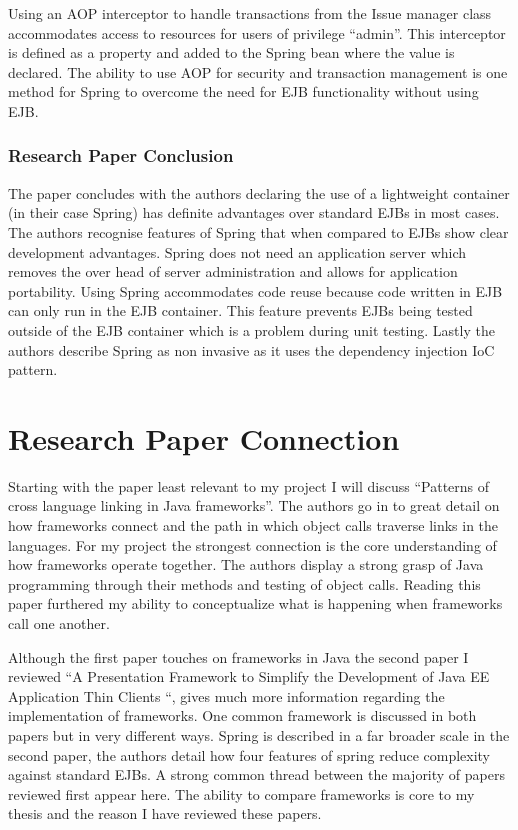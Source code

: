 														Using an AOP interceptor to handle transactions from the Issue manager class accommodates access to resources for users of privilege “admin”. This interceptor is defined as a property and added to the Spring bean where the value is declared. The ability to use AOP for security and transaction management is one method for Spring to overcome the need for EJB functionality without using EJB.
														
														\subsubsection{Research Paper Conclusion}
														The paper concludes with the authors declaring the use of a lightweight container (in their case Spring) has definite advantages over standard EJBs in most cases. The authors recognise features of Spring that when compared to EJBs show clear development advantages. Spring does not need an application server which removes the over head of server administration and allows for application portability. Using Spring accommodates code reuse because code written in EJB can only run in the EJB container. This feature prevents EJBs being tested outside of the EJB container which is a problem during unit testing. Lastly the authors describe Spring as non invasive as it uses the dependency injection IoC pattern. 
														
														\section{Research Paper Connection}
														
														Starting with the paper least relevant to my project I will discuss “Patterns of cross language linking in Java frameworks”. The authors go in to great detail on how frameworks connect and the path in which object calls traverse links in the languages. For my project the strongest connection is the core understanding of how frameworks operate together. The authors display a strong grasp of Java programming through their methods and testing of object calls. Reading this paper furthered my ability to conceptualize what is happening when frameworks call one another. 
														
														Although the first paper touches on frameworks in Java the second paper I reviewed “A Presentation Framework to Simplify the Development of Java EE Application Thin 
														Clients “, gives much more information regarding the implementation of frameworks. One common framework is discussed in both papers but in very different ways. Spring is described in a far broader scale in the second paper, the authors detail how four features of spring reduce complexity against standard EJBs. A strong common thread between the majority of papers reviewed first appear here. The ability to compare frameworks is core to my thesis and the reason I have reviewed these papers. 
														
